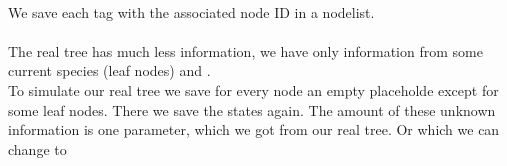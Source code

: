        \\
      We save each tag with the associated node ID in a nodelist. \\
       \\
      The real tree has much less information, we have only information from some current species 
        (leaf nodes) and . \\
      To simulate our real tree we save for every node an empty placeholde except for some leaf nodes.
      There we save the states again. The amount of these unknown information is one parameter, which we
      got from our real tree. Or which we can change to 

